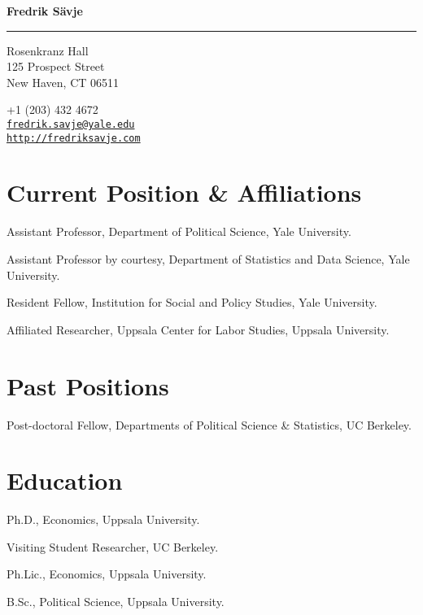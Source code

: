 \documentclass[10pt,letterpaper]{article}
\newenvironment{datelist}{
	\begin{list}{}{
		\setlength{\parskip}{0pt}
		\setlength{\itemsep}{4pt}
		\setlength{\parsep}{0.3em}
		\setlength{\leftmargin}{6em}
		\setlength{\labelwidth}{6em}
		\setlength{\labelsep}{1.5em}
		}
	}{
\end{list}
}
\newcommand{\dateitem}[2][]{\item[{#1}] {#2}}
\newenvironment{infolist}{
	\begin{list}{}{
		\setlength{\parskip}{0pt}
		\setlength{\itemsep}{4pt}
		\setlength{\parsep}{0.3em}
		\setlength{\leftmargin}{1.6em}
		\setlength{\labelwidth}{0pt}
		}
	}{
\end{list}
}
\newcommand{\infoitem}[1]{\item {#1}}
\begin{document}
	{\huge \bf Fredrik Sävje}

	\rule{\textwidth}{1pt}

	\bigskip


	\begin{minipage}[t]{0.495\textwidth}
		Rosenkranz Hall \\
		125 Prospect Street \\
		New Haven, CT 06511
	\end{minipage}
	\begin{minipage}[t]{0.495\textwidth}
		+1 (203) 432 4672 \\
		\href{mailto:fredrik.savje@yale.edu}{\texttt{fredrik.savje@yale.edu}} \\
		\href{http://fredriksavje.com}{\texttt{http://fredriksavje.com}}
	\end{minipage}

	\bigskip


	\section*{Current Position \& Affiliations}

	\begin{infolist}
		\infoitem{Assistant Professor, Department of Political Science, Yale University.}
		\infoitem{Assistant Professor by courtesy, Department of Statistics and Data Science, Yale University.}
		\infoitem{Resident Fellow, Institution for Social and Policy Studies, Yale University.}
		\infoitem{Affiliated Researcher, Uppsala Center for Labor Studies, Uppsala University.}
	\end{infolist}


	\section*{Past Positions}

	\begin{datelist}
		\dateitem[2015--2017]{Post-doctoral Fellow, Departments of Political Science \& Statistics, UC Berkeley.}
	\end{datelist}


	\section*{Education}

	\begin{datelist}
		\dateitem[2015]{Ph.D., Economics, Uppsala University.}
		\dateitem[2013--2014]{Visiting Student Researcher, UC Berkeley.}
		\dateitem[2013]{Ph.Lic., Economics, Uppsala University.}
		\dateitem[2010]{B.Sc., Political Science, Uppsala University.}
	\end{datelist}
\end{document}
